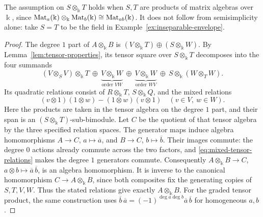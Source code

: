 \begin{advanced}[suppressfirstparskip=true,innertopmargin=0pt]
The assumption on $S\otimes_\Bbbk T$ holds when $S,T$ are products of matrix algebras over $\Bbbk$, since $\operatorname{Mat}\nolimits_a(\Bbbk)\otimes_\Bbbk\operatorname{Mat}\nolimits_b(\Bbbk)\cong\operatorname{Mat}\nolimits_{ab}(\Bbbk)$.
It does not follow from semisimplicity alone: take $S=T$ to be the field in Example~\ref{ex:inseparable-envelope}.

\begin{proof}
The degree $1$ part of $A\otimes_\Bbbk B$ is $(V\otimes_\Bbbk T)\oplus(S\otimes_\Bbbk W)$.
By Lemma~\ref{lem:tensor-properties}, its tensor square over $S\otimes_\Bbbk T$ decomposes into the four summands
\[
(V\otimes_S V)\otimes_\Bbbk T
\ \oplus\ \underbrace{V\otimes_\Bbbk W}_{\text{order }VW}
\ \oplus\ \underbrace{V\otimes_\Bbbk W}_{\text{order }WV}
\ \oplus\ S\otimes_\Bbbk(W\otimes_T W).
\]
Its quadratic relations consist of $R\otimes_\Bbbk T$, $S\otimes_\Bbbk Q$, and the mixed relations
\begin{equation}\label{eq:mixed-tensor-relations}
(v\otimes1)(1\otimes w)-(1\otimes w)(v\otimes1)
\quad(v\in V,\ w\in W).
\end{equation}
Here the products are taken in the tensor algebra on the degree $1$ part, and their span is an $(S\otimes_\Bbbk T)$-sub-bimodule.
Let $C$ be the quotient of that tensor algebra by the three specified relation spaces.
The generator maps induce algebra homomorphisms $A\to C$, $a\mapsto\overline a$, and $B\to C$, $b\mapsto\overline b$.
Their images commute: the degree $0$ actions already commute across the two factors, and \eqref{eq:mixed-tensor-relations} makes the degree $1$ generators commute.
Consequently $A\otimes_\Bbbk B\to C$, $a\otimes b\mapsto\overline a\,\overline b$, is an algebra homomorphism.
It is inverse to the canonical homomorphism $C\to A\otimes_\Bbbk B$, since both composites fix the generating copies of $S,T,V,W$. Thus the stated relations give exactly $A\otimes_\Bbbk B$.
For the graded tensor product, the same construction uses $\overline b\,\overline a=(-1)^{\deg a\deg b}\overline a\,\overline b$ for homogeneous $a,b$.


\end{proof}
\end{advanced}
